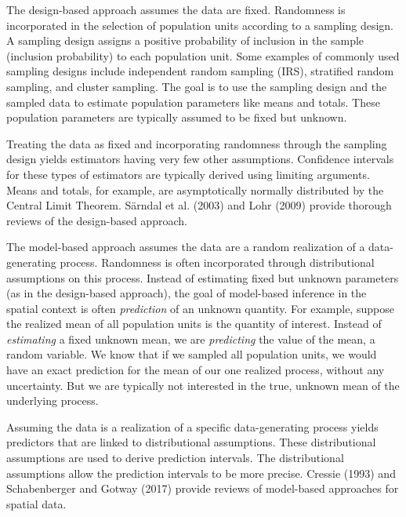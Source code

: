 \documentclass[]{elsarticle} %
\begin{document}
The design-based approach assumes the data are fixed. Randomness is
incorporated in the selection of population units according to a
sampling design. A sampling design assigns a positive probability of
inclusion in the sample (inclusion probability) to each population unit.
Some examples of commonly used sampling designs include independent
random sampling (IRS), stratified random sampling, and cluster sampling.
The goal is to use the sampling design and the sampled data to estimate
population parameters like means and totals. These population parameters
are typically assumed to be fixed but unknown.

Treating the data as fixed and incorporating randomness through the
sampling design yields estimators having very few other assumptions.
Confidence intervals for these types of estimators are typically derived
using limiting arguments. Means and totals, for example, are
asymptotically normally distributed by the Central Limit Theorem.
Särndal et al. (2003) and Lohr (2009) provide thorough reviews of the
design-based approach.

The model-based approach assumes the data are a random realization of a
data-generating process. Randomness is often incorporated through
distributional assumptions on this process. Instead of estimating fixed
but unknown parameters (as in the design-based approach), the goal of
model-based inference in the spatial context is often \emph{prediction}
of an unknown quantity. For example, suppose the realized mean of all
population units is the quantity of interest. Instead of
\emph{estimating} a fixed unknown mean, we are \emph{predicting} the
value of the mean, a random variable. We know that if we sampled all
population units, we would have an exact prediction for the mean of our
one realized process, without any uncertainty. But we are typically not
interested in the true, unknown mean of the underlying process.

Assuming the data is a realization of a specific data-generating process
yields predictors that are linked to distributional assumptions. These
distributional assumptions are used to derive prediction intervals. The
distributional assumptions allow the prediction intervals to be more
precise. Cressie (1993) and Schabenberger and Gotway (2017) provide
reviews of model-based approaches for spatial data.
\end{document}
